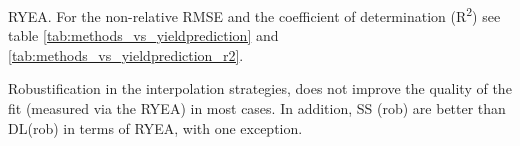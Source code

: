 	\begin{table}
		\begin{center}
			\caption{RYEA. For the non-relative RMSE and the coefficient of determination (R\textsuperscript{2}) see table \ref{tab:methods_vs_yieldprediction} and \ref{tab:methods_vs_yieldprediction_r2}.}
			\small
			
			\label{tab:methods_vs_yieldprediction_relative}
			\normalsize
		\end{center}
	\end{table}

	Robustification in the interpolation strategies, does not improve the quality of the fit (measured via the RYEA) in most cases. 
	In addition, SS (rob) are better than DL(rob) in terms of RYEA, with one exception.
	
